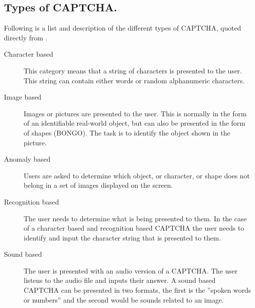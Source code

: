 \documentclass[pdftex,a4paper,12pt,twoside]{report}
\begin{document}
\subsection{Types of CAPTCHA.}
Following is a list and description of the different types of CAPTCHA, quoted directly from \citep{Sauer2008}.
\begin{description}
\item[Character based]This category means that a string of characters is presented to the user. This string can contain either words or random alphanumeric characters.
\item[Image based]Images or pictures are presented to the user. This is normally in the form of an identifiable real-world object, but can also be presented in the form of shapes (BONGO). The task is to identify the object shown in the picture.
\item[Anomaly based]Users are asked to determine which object, or character, or shape does not belong in a set of images displayed on the screen.
\item[Recognition based]The user needs to determine what is being presented to them. In the case of a character based and recognition based CAPTCHA the user needs to identify and input the character string that is presented to them.
\item[Sound based]The user is presented with an audio version of a CAPTCHA. The user listens to the audio file and inputs their answer. A sound based CAPTCHA can be presented in two formats, the first is the ''spoken words or numbers'' and the second would be sounds related to an image.
\end{description}
\end{document}
